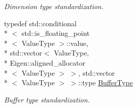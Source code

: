 \begin{DoxyCompactItemize}
\begin{DoxyCompactList}\small\item\em Dimension type standardization. \end{DoxyCompactList}\item 
typedef std\-::conditional\\*
$<$ std\-::is\-\_\-floating\-\_\-point\\*
$<$ Value\-Type $>$\-::value, \\*
std\-::vector$<$ Value\-Type, \\*
Eigen\-::aligned\-\_\-allocator\\*
$<$ Value\-Type $>$ $>$, std\-::vector\\*
$<$ Value\-Type $>$ $>$\-::type \hyperlink{classffnn_1_1layer_1_1_layer_ae755be4e0e146b543c0b46a9b8e0bb01}{Buffer\-Type}
\begin{DoxyCompactList}\small\item\em Buffer type standardization. \end{DoxyCompactList}\end{DoxyCompactItemize}
